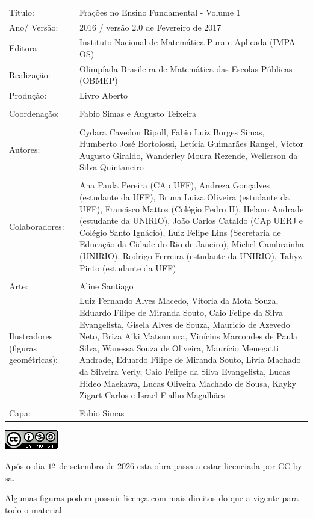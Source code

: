 \documentclass[a4,12pt,openany]{book} %
\begin{document}
\begin{changemargin}{-5cm}{-5cm}
{\begin{center}
\begin{tabular}{p{}p{}}
Título: & Frações no Ensino Fundamental - Volume 1\\
Ano/ Versão: & 2016 / versão 2.0 de Fevereiro de 2017 \\
Editora & Instituto Nacional de Matem\'atica Pura e Aplicada (IMPA-OS)\\
Realização:& Olimp\'iada Brasileira de Matem\'atica das Escolas P\'ublicas (OBMEP)\\
Produção:& Livro Aberto\\
\\
Coordenação: & Fabio Simas e Augusto Teixeira\\
\\
Autores: & Cydara Cavedon Ripoll, Fabio Luiz Borges Simas, Humberto José Bortolossi, Letícia Guimarães Rangel, Victor Augusto Giraldo, Wanderley Moura Rezende, Wellerson  da Silva Quintaneiro\\
\\
Colaboradores: & Ana Paula Pereira (CAp UFF), Andreza Gonçalves (estudante da UFF), Bruna Luiza Oliveira (estudante da UFF), Francisco Mattos (Colégio Pedro II), Helano Andrade (estudante da UNIRIO), João Carlos Cataldo (CAp UERJ e Colégio Santo Ignácio), Luiz Felipe Lins (Secretaria de Educação da Cidade do Rio de Janeiro), Michel Cambrainha (UNIRIO), Rodrigo Ferreira (estudante da UNIRIO), Tahyz Pinto (estudante da UFF) \\
\\
Arte: & Aline Santiago
\\
Ilustradores (figuras geométricas): & Luiz Fernando Alves Macedo,
Vitoria da Mota Souza,
Eduardo Filipe de Miranda Souto,
Caio Felipe da Silva Evangelista,
Gisela Alves de Souza,
Mauricio de Azevedo Neto,
Briza Aiki Matsumura,
Vinícius Marcondes de Paula Silva,
Wanessa Souza de Oliveira,
Maurício Menegatti Andrade,
Eduardo Filipe de Miranda Souto,
Livia Machado da Silveira Verly,
Caio Felipe da Silva Evangelista,
Lucas Hideo Maekawa,
Lucas Oliveira Machado de Sousa,
Kayky Zigart Carlos e
Israel Fialho Magalhães\\
\\
Capa: & Fabio Simas
\end{tabular}
\vspace{.2cm}

\includegraphics[scale=1]{cc}

Após o dia $1^{\textrm{\underline{o}}}$ de setembro de 2026 esta obra passa a estar licenciada por CC-by-sa.

Algumas figuras podem possuir licença com mais direitos do que a vigente para todo o material.
\end{center}
}
\end{changemargin}
\end{document}
